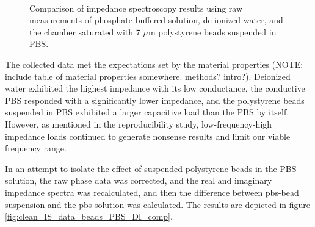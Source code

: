 \begin{figure}[h]
\begin{subfigure}[b]{\textwidth}
    \end{subfigure}
    \\
    \caption[PBS, DI, microbead IS Raw data comparison.]{Comparison of impedance spectroscopy results using raw measurements of phosphate buffered solution, de-ionized water, and the chamber saturated with 7 $\mu$m polystyrene beads suspended in PBS.}
    \label{fig:IS_data_beads_pbs_DI_comp}
\end{figure}


\par The collected data met the expectations set by the material properties (NOTE: include table of material properties somewhere. methods? intro?). Deionized water exhibited the highest impedance with its low conductance, the conductive PBS responded with a significantly lower impedance, and the polystyrene beads suspended in PBS exhibited a larger capacitive load than the PBS by itself. However, as mentioned in the reproducibility study, low-frequency-high impedance loads continued to generate nonsense results and limit our viable frequency range.

\par In an attempt to isolate the effect of suspended polystyrene beads in the PBS solution, the raw phase data was corrected, and the real and imaginary impedance spectra was recalculated, and then the difference between pbs-bead suspension and the pbs solution was calculated. The results are depicted in figure \ref{fig:clean_IS_data_beads_PBS_DI_comp}.


